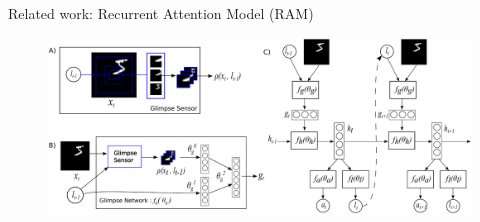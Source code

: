 \documentclass[10pt]{beamer}
\begin{document}


\begin{frame}{Related work: Recurrent Attention Model (RAM)}
    \begin{figure}
        \centering
        \includegraphics[width=1.0\linewidth]{./img/recurr_model.png}
    \end{figure}
\end{frame}

\end{document}
